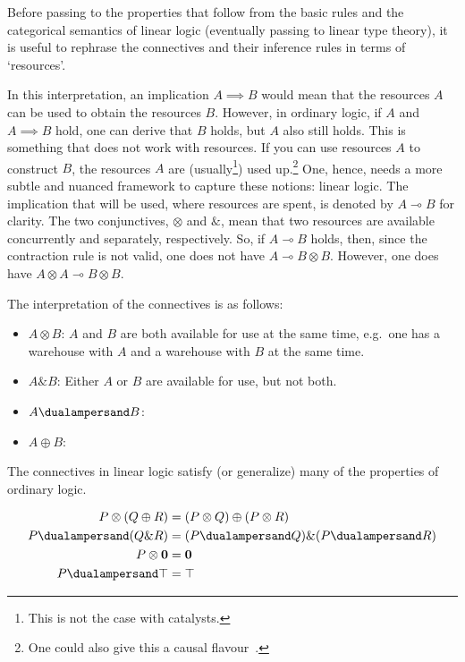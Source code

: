     \begin{remark}
        Before passing to the properties that follow from the basic rules and the categorical semantics of linear logic (eventually passing to linear type theory), it is useful to rephrase the connectives and their inference rules in terms of `resources'.

        In this interpretation, an implication $A\implies B$ would mean that the resources $A$ can be used to obtain the resources $B$. However, in ordinary logic, if $A$ and $A\implies B$ hold, one can derive that $B$ holds, but $A$ also still holds. This is something that does not work with resources. If you can use resources $A$ to construct $B$, the resources $A$ are (usually\footnote{This is not the case with catalysts.}) used up.\footnote{One could also give this a causal flavour~\citep{girard_linear_1995}.} One, hence, needs a more subtle and nuanced framework to capture these notions: linear logic. The implication that will be used, where resources are spent, is denoted by $A\multimap B$ for clarity. The two conjunctives, $\otimes$ and $\&$, mean that two resources are available concurrently and separately, respectively. So, if $A\multimap B$ holds, then, since the contraction rule is not valid, one does not have $A\multimap B\otimes B$. However, one does have $A\otimes A\multimap B\otimes B$.

        The interpretation of the connectives is as follows:
        \begin{itemize}
            \item $A\otimes B$: $A$ and $B$ are both available for use at the same time, e.g.~one has a warehouse with $A$ and a warehouse with $B$ at the same time.
            \item $A\& B$: Either $A$ or $B$ are available for use, but not both.
            \item $A\dualampersand B$:
            \item $A\oplus B$: 
        \end{itemize}
    \end{remark}

    The connectives in linear logic satisfy (or generalize) many of the properties of ordinary logic.
    \begin{property}[Distributivity]
        \begin{gather}
            \begin{aligned}
                P\otimes(Q\oplus R) &= (P\otimes Q)\oplus(P\otimes R)\\
                P\dualampersand(Q\& R) &= (P\dualampersand Q)\&(P\dualampersand R)\\
                P\otimes\mathbf{0} &= \mathbf{0}\\
                P\dualampersand\top &= \top
            \end{aligned}
        \end{gather}
    \end{property}

